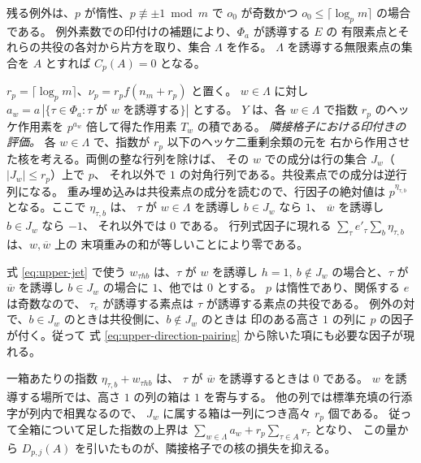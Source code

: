 残る例外は、\(p\) が惰性、\(p\not\equiv\pm1\bmod m\) で
\(o_0\) が奇数かつ \(o_0\le\lceil\log_p m\rceil\) の場合である。
例外素数での印付けの補題により、\(\Phi_a\) が誘導する \(E\) の
有限素点とそれらの共役の各対から片方を取り、集合 \(\Lambda\) を作る。
\(\Lambda\) を誘導する無限素点の集合を \(A\) とすれば \(C_p(A)=0\) となる。

\(r_p=\lceil\log_p m\rceil\)、\(\nu_p=r_pf(n_m+r_p)\) と置く。
\(w\in\Lambda\) に対し \(a_w=a\,|\{\tau\in\Phi_a:\tau\text{ が }w
\text{ を誘導する}\}|\) とする。
\(Y\) は、各 \(w\in\Lambda\) で指数 \(r_p\) のヘッケ作用素を
\(p^{a_w}\) 倍して得た作用素 \(T_w\) の積である。
\emph{隣接格子における印付きの評価。}
各 \(w\in\Lambda\) で、指数が \(r_p\) 以下のヘッケ二重剰余類の元を
右から作用させた核を考える。両側の整な行列を除けば、
その \(w\) での成分は行の集合 \(J_w\)（\(|J_w|\le r_p\)）上で \(p\)、
それ以外で \(1\) の対角行列である。共役素点での成分は逆行列になる。
重み埋め込みは共役素点の成分を読むので、行因子の絶対値は
\(p^{\eta_{\tau,b}}\) となる。ここで \(\eta_{\tau,b}\) は、
\(\tau\) が \(w\in\Lambda\) を誘導し \(b\in J_w\) なら \(1\)、
\(\overline w\) を誘導し \(b\in J_w\) なら \(-1\)、
それ以外では \(0\) である。
行列式因子に現れる
\(\sum_\tau e'_\tau\sum_b\eta_{\tau,b}\) は、\(w,\overline w\) 上の
末項重みの和が等しいことにより零である。

式 \eqref{eq:upper-jet} で使う \(w_{\tau h b}\) は、\(\tau\) が \(w\) を誘導し
\(h=1,\ b\notin J_w\) の場合と、\(\tau\) が \(\overline w\) を誘導し
\(b\in J_w\) の場合に \(1\)、他では \(0\) とする。
\(p\) は惰性であり、関係する \(e\) は奇数なので、
\(\tau_e\) が誘導する素点は \(\tau\) が誘導する素点の共役である。
例外の対で、\(b\in J_w\) のときは共役側に、\(b\notin J_w\) のときは
印のある高さ \(1\) の列に \(p\) の因子が付く。従って
式 \eqref{eq:upper-direction-pairing} から除いた項にも必要な因子が現れる。

一箱あたりの指数 \(\eta_{\tau,b}+w_{\tau h b}\) は、
\(\tau\) が \(\overline w\) を誘導するときは \(0\) である。
\(w\) を誘導する場所では、高さ \(1\) の列の箱は \(1\) を寄与する。
他の列では標準充填の行添字が列内で相異なるので、
\(J_w\) に属する箱は一列につき高々 \(r_p\) 個である。
従って全箱について足した指数の上界は
\(\sum_{w\in\Lambda}a_w+r_p\sum_{\tau\in A} r_\tau\) となり、
この量から \(D_{p,j}(A)\) を引いたものが、隣接格子での核の損失を抑える。

